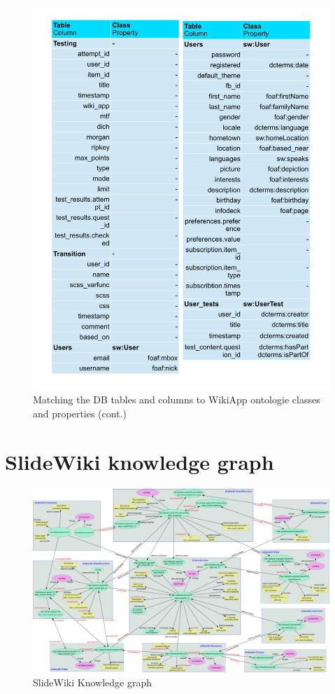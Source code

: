 \begin{figure}[!b]
	\centering
		\includegraphics[width=\columnwidth]{images/mapping_pages3.pdf}
		\caption{Matching the DB tables and columns to WikiApp ontologie classes and properties (cont.)}
	\label{fig:wa_matching_3}
\end{figure}


\section{SlideWiki knowledge graph}


\begin{figure}
    \centering
    \includegraphics[width=\columnwidth]{images/knowledge_graph.png}
    \caption{SlideWiki Knowledge graph}
	\label{fig:knowledge_graph}
\end{figure}




